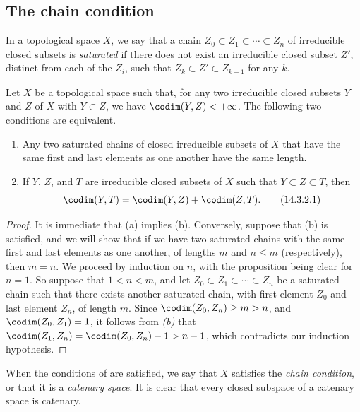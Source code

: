 \subsection{The chain condition}
\label{subsection:0.14.3}

\begin{env}[14.3.1]
\label{0.14.3.1}
In a topological space $X$, we say that a chain $Z_0\subset Z_1\subset\cdots\subset Z_n$ of irreducible closed subsets is \emph{saturated} if there does not exist an irreducible closed subset $Z'$, distinct from each of the $Z_i$, such that $Z_k\subset Z'\subset Z_{k+1}$ for any $k$.
\end{env}

\begin{proposition}[14.3.2]
\label{0.14.3.2}
Let $X$ be a topological space such that, for any two irreducible closed subsets $Y$ and $Z$ of $X$ with $Y\subset Z$, we have $\codim(Y,Z)<+\infty$.
The following two conditions are equivalent.
\begin{enumerate}
  \item[{\rm(a)}] Any two saturated chains of closed irreducible subsets of $X$ that have the same first and last elements as one another have the same length.
  \item[{\rm(b)}] If $Y$, $Z$, and $T$ are irreducible closed subsets of $X$ such that $Y\subset Z\subset T$, then
    \[
    \label{0.14.3.2.1}
      \codim(Y,T)=\codim(Y,Z)+\codim(Z,T).
      \tag{14.3.2.1}
    \]
\end{enumerate}
\end{proposition}

\begin{proof}
It is immediate that (a) implies (b).
Conversely, suppose that (b) is satisfied, and we will show that if we have two saturated chains with the same first and last elements as one another, of lengths $m$ and $n\leq m$ (respectively), then $m=n$.
We proceed by induction on $n$, with the proposition being clear for $n=1$.
So suppose that $1<n<m$, and let $Z_0\subset Z_1\subset\cdots\subset Z_n$ be a
saturated chain such that there exists another saturated chain, with first element $Z_0$ and last element $Z_n$, of length $m$.
Since $\codim(Z_0,Z_n)\geq m>n$, and $\codim(Z_0,Z_1)=1$, it follows from \emph{(b)} that $\codim(Z_1,Z_n)=\codim(Z_0,Z_n)-1>n-1$, which contradicts our induction hypothesis.
\end{proof}

When the conditions of  are satisfied, we say that $X$ satisfies the \emph{chain condition}, or that it is a \emph{catenary space}.
It is clear that every closed subspace of a catenary space is catenary.

